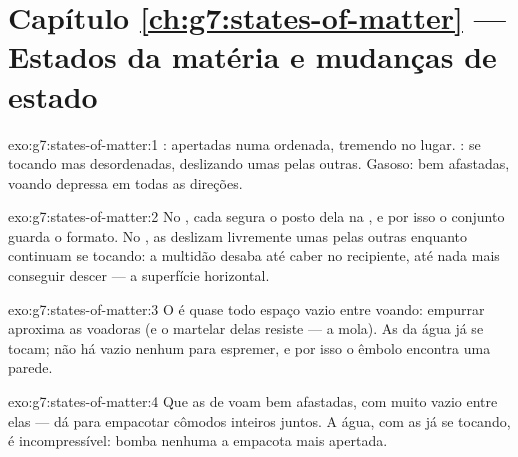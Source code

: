 \section*{Capítulo \ref{ch:g7:states-of-matter} --- Estados da matéria e mudanças de estado}

\begin{solution}{exo:g7:states-of-matter:1}
:  apertadas numa  ordenada, tremendo no lugar.
:  se tocando mas desordenadas, deslizando umas pelas
outras. Gasoso:  bem afastadas, voando depressa em todas as
direções.
\end{solution}

\begin{solution}{exo:g7:states-of-matter:2}
No , cada  segura o posto dela na , e por isso o
conjunto guarda o formato. No , as  deslizam
livremente umas pelas outras enquanto continuam se tocando: a
multidão desaba até caber no recipiente, até nada mais conseguir
descer --- a superfície horizontal.
\end{solution}

\begin{solution}{exo:g7:states-of-matter:3}
O  é quase todo espaço vazio entre  voando: empurrar
aproxima as voadoras (e o martelar delas resiste --- a mola). As
 da água já se tocam; não há vazio nenhum para espremer, e
por isso o êmbolo encontra uma parede.
\end{solution}

\begin{solution}{exo:g7:states-of-matter:4}
Que as  de  voam bem afastadas, com muito vazio entre
elas --- dá para empacotar cômodos inteiros juntos. A água, com as
 já se tocando, é incompressível: bomba nenhuma a empacota
mais apertada.
\end{solution}


